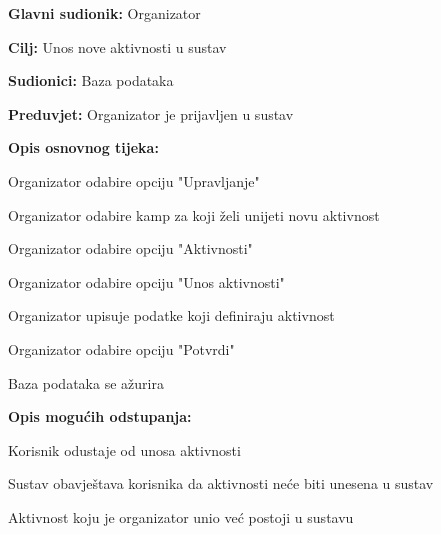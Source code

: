 					\noindent {}
					\begin{packed_item}
						
						\item \textbf{Glavni sudionik: }Organizator
						\item  \textbf{Cilj:} Unos nove aktivnosti u sustav
						\item  \textbf{Sudionici:} Baza podataka
						\item  \textbf{Preduvjet:} Organizator je prijavljen u sustav
						\item  \textbf{Opis osnovnog tijeka:}
						
						\item[] \begin{packed_enum}
							
							\item Organizator odabire opciju "Upravljanje"
							\item Organizator odabire kamp za koji želi unijeti novu aktivnost
							\item Organizator odabire opciju "Aktivnosti"
							\item Organizator odabire opciju "Unos aktivnosti"
							\item Organizator upisuje podatke koji definiraju aktivnost
							\item Organizator odabire opciju "Potvrdi"
							\item Baza podataka se ažurira
						\end{packed_enum}
						
						\item  \textbf{Opis mogućih odstupanja:}
						
						\item[] \begin{packed_item}
							
							\item[3.a] Korisnik odustaje od unosa aktivnosti
							\item[] \begin{packed_enum}
								
								\item Sustav obavještava korisnika da aktivnosti neće biti unesena u sustav
								
							\end{packed_enum}
							
							\item[6.a] Aktivnost koju je organizator unio već postoji u sustavu
							\item[] \begin{packed_enum}
								

\end{packed_enum}
\end{packed_item}
\end{packed_item}
